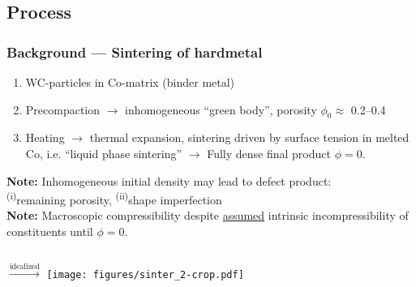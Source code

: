 \documentclass[11pt]{beamer} %
\renewcommand{\alert}[1]{\textbf{#1}}
\begin{document}
\subsection{Process}
\begin{frame}
 \frametitle{Background --- Sintering of hardmetal}


 \begin{enumerate}
  \item WC-particles in Co-matrix (binder metal)
  \item Precompaction $\rightarrow$ inhomogeneous ``green body'', porosity $\phi_0\approx$ 0.2--0.4
  \item Heating $\rightarrow$ thermal expansion, sintering driven by surface tension in melted Co, i.e. ``liquid phase sintering'' $\rightarrow$
        Fully dense final product $\phi=0$.
 \end{enumerate}
\alert{Note:} Inhomogeneous initial density may lead to defect product:\\ \textsuperscript{(i)}remaining porosity, \textsuperscript{(ii)}shape imperfection\\
\alert{Note:} Macroscopic compressibility despite \underline{assumed} intrinsic incompressibility of constituents until $\phi = 0$.
\begin{center}
 \begin{columns}
 \centering
 \centering
 $\xrightarrow{\text{idealized}}$
 \centering
 \texttt{[image: figures/sinter\_2-crop.pdf]}
 \end{columns}
\end{center}
\end{frame}
\end{document}
